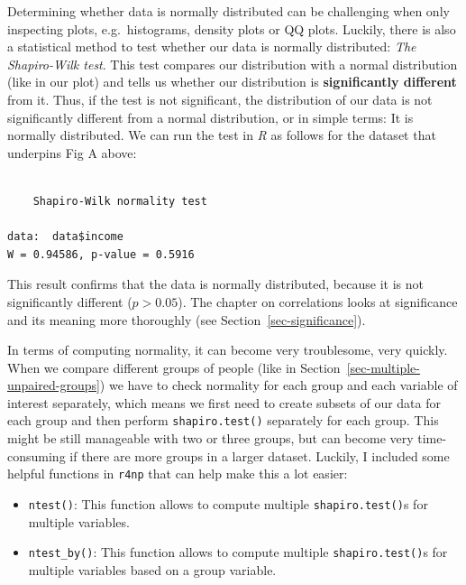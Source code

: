 \documentclass[
  letterpaper,
]{krantz}
\makeatletter
\newenvironment{Shaded}{\begin{snugshade}}{\end{snugshade}}
\newcommand{\FunctionTok}[1]{\textcolor[rgb]{0.28,0.35,0.67}{#1}}
\newcommand{\NormalTok}[1]{\textcolor[rgb]{0.00,0.23,0.31}{#1}}
\newcommand{\SpecialCharTok}[1]{\textcolor[rgb]{0.37,0.37,0.37}{#1}}
\newenvironment{kframe}{%
\medskip{}
\setlength{\fboxsep}{.8em}
 \def\at@end@of@kframe{}%
 \ifinner\ifhmode%
  \def\at@end@of@kframe{\end{minipage}}%
  \begin{minipage}{\columnwidth}%
 \fi\fi%
 \def\FrameCommand##1{\hskip\@totalleftmargin \hskip-\fboxsep
 \colorbox{shadecolor}{##1}\hskip-\fboxsep
     \hskip-\linewidth \hskip-\@totalleftmargin \hskip\columnwidth}%
 \MakeFramed {\advance\hsize-\width
   \@totalleftmargin\z@ \linewidth\hsize
   \@setminipage}}%
 {\par\unskip\endMakeFramed%
 \at@end@of@kframe}
\renewenvironment{Shaded}{\begin{kframe}}{\end{kframe}}
\makeatother
\begin{document}
Determining whether data is normally distributed can be challenging when
only inspecting plots, e.g.~histograms, density plots or QQ plots.
Luckily, there is also a statistical method to test whether our data is
normally distributed: \emph{The Shapiro-Wilk test}. This test compares
our distribution with a normal distribution (like in our plot) and tells
us whether our distribution is \textbf{significantly different} from it.
Thus, if the test is not significant, the distribution of our data is
not significantly different from a normal distribution, or in simple
terms: It is normally distributed. We can run the test in \emph{R} as
follows for the dataset that underpins Fig A above:

\begin{Shaded}
\end{Shaded}

\begin{verbatim}

    Shapiro-Wilk normality test

data:  data$income
W = 0.94586, p-value = 0.5916
\end{verbatim}

This result confirms that the data is normally distributed, because it
is not significantly different (\(p > 0.05\)). The chapter on
correlations looks at significance and its meaning more thoroughly (see
Section~\ref{sec-significance}).

In terms of computing normality, it can become very troublesome, very
quickly. When we compare different groups of people (like in
Section~\ref{sec-multiple-unpaired-groups}) we have to check normality
for each group and each variable of interest separately, which means we
first need to create subsets of our data for each group and then perform
\texttt{shapiro.test()} separately for each group. This might be still
manageable with two or three groups, but can become very time-consuming
if there are more groups in a larger dataset. Luckily, I included some
helpful functions in \texttt{r4np} that can help make this a lot easier:

\begin{itemize}
\item
  \texttt{ntest()}: This function allows to compute multiple
  \texttt{shapiro.test()}s for multiple variables.
\item
  \texttt{ntest\_by()}: This function allows to compute multiple
  \texttt{shapiro.test()}s for multiple variables based on a group
  variable.
\end{itemize}
\end{document}
